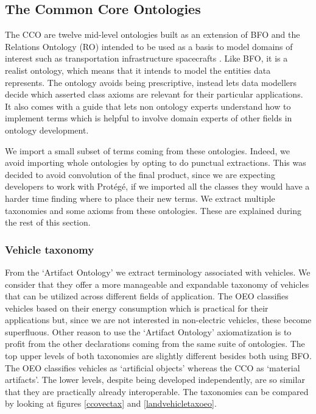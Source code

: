 \subsection{The Common Core Ontologies}

The CCO are twelve mid-level ontologies built as an extension of BFO and the
Relations Ontology (RO) intended to be used as a basis to model domains of
interest such as transportation infrastructure spacecrafts
\cite{Rudnicki.23September2020}. Like BFO, it is a realist ontology, which
means that it intends to model the entities data represents. The ontology
avoids being prescriptive, instead lets data modellers decide which asserted
class axioms are relevant for their particular applications. It also comes with
a guide that lets non ontology experts understand how to implement terms which
is helpful to involve domain experts of other fields in ontology development.

We import a small subset of terms coming from these ontologies. Indeed, we
avoid importing whole ontologies by opting to do punctual extractions. This was
decided to avoid convolution of the final product, since we are expecting
developers to work with Protégé, if we imported all the classes they would have
a harder time finding where to place their new terms. We extract multiple
taxonomies and some axioms from these ontologies. These are explained during the
rest of this section.

\subsubsection{Vehicle taxonomy}

From the `Artifact Ontology' we extract terminology associated with vehicles.
We consider that they offer a more manageable and expandable taxonomy of
vehicles that can be utilized across different fields of application. The OEO
classifies vehicles based on their energy consumption which is practical for
their applications but, since we are not interested in non-electric vehicles,
these become superfluous. Other reason to use the `Artifact Ontology'
axiomatization is to profit from the other declarations coming from the same
suite of ontologies. The top upper levels of both taxonomies are slightly
different besides both using BFO. The OEO classifies vehicles as `artificial
objects' whereas the CCO as `material artifacts'. The lower levels, despite
being developed independently, are so similar  that they are practically
already interoperable. The taxonomies can be compared by looking at figures
\ref{ccovectax} and \ref{landvehicletaxoeo}.

